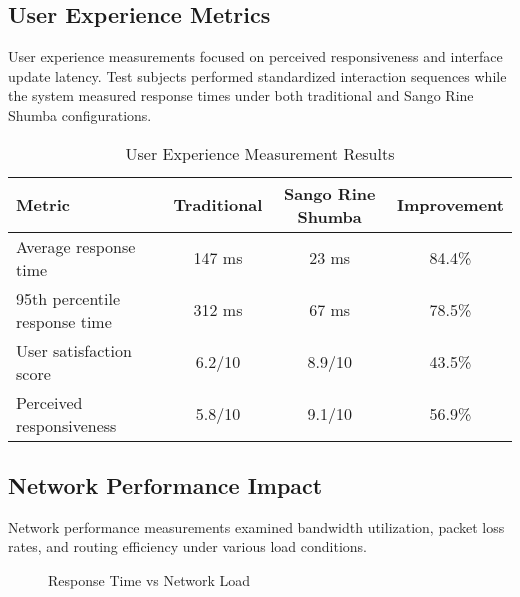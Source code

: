 \documentclass[12pt,a4paper]{article}
\begin{document}
\subsection{User Experience Metrics}

User experience measurements focused on perceived responsiveness and interface update latency. Test subjects performed standardized interaction sequences while the system measured response times under both traditional and Sango Rine Shumba configurations.

\begin{table}[htbp]
\centering
\caption{User Experience Measurement Results}
\begin{tabular}{@{}lccc@{}}
\toprule
\textbf{Metric} & \textbf{Traditional} & \textbf{Sango Rine Shumba} & \textbf{Improvement} \\
\midrule
Average response time & 147 ms & 23 ms & 84.4\% \\
95th percentile response time & 312 ms & 67 ms & 78.5\% \\
User satisfaction score & 6.2/10 & 8.9/10 & 43.5\% \\
Perceived responsiveness & 5.8/10 & 9.1/10 & 56.9\% \\
\bottomrule
\end{tabular}
\end{table}

\subsection{Network Performance Impact}

Network performance measurements examined bandwidth utilization, packet loss rates, and routing efficiency under various load conditions.

\begin{figure}[htbp]
\centering
{}
\caption{Response Time vs Network Load}
\end{figure}
\end{document}
